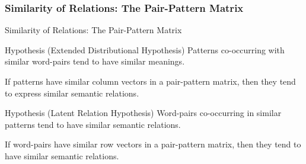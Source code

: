 \subsubsection{Similarity of Relations: The Pair-Pattern Matrix}
\begin{frame}[shrink=10]{Similarity of Relations: The Pair-Pattern Matrix}
\begin{block}{Hypothesis (Extended Distributional Hypothesis)}
Patterns co-occurring with similar word-pairs tend to have similar meanings\cite{Lin2001vsmh3}.
\end{block}
If patterns have similar column vectors in a pair-pattern matrix, then they tend to express similar semantic relations.
\begin{block}{Hypothesis (Latent Relation Hypothesis)}
Word-pairs co-occurring in similar patterns tend to have similar semantic relations\cite{Turney2003vsmh4}.
\end{block}
If word-pairs have similar row vectors in a pair-pattern matrix, then they tend to have similar semantic relations.\\
\end{frame}

